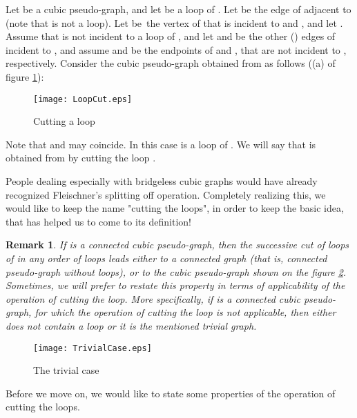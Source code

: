 \documentclass[fleqn,12pt,twoside]{article}
\newtheorem{remark}{Remark}
\begin{document}
Let  be a cubic pseudo-graph, and let  be a loop of . Let  be the edge of  adjacent to  (note that  is not a
loop). Let  be\ the vertex of  that is incident to 
and , and
let . Assume that  is not incident to a loop of , and let  and  be the other () edges of  incident to , and assume  and  be the endpoints
of  and , that are not incident to , respectively.
Consider the cubic pseudo-graph  obtained from  as
follows ((a)
of figure \ref{loopcut}):

\begin{figure}[h]
\begin{center}
\texttt{[image: LoopCut.eps]}\\
\caption{Cutting a loop }\label{loopcut}
\end{center}
\end{figure}


Note that  and  may coincide. In this case  is a loop of . We will say that  is obtained from  by
cutting the loop .

People dealing especially with bridgeless cubic graphs would have
already recognized Fleischner's splitting off operation. Completely
realizing this, we would like to keep the name "cutting the loops",
in order to keep the basic idea, that has helped us to come to its
definition!

\begin{remark}
\label{SuccessiveCut}If  is a connected cubic pseudo-graph,
then the successive cut of loops of  in any order of loops
leads either to a connected graph (that is, connected pseudo-graph
without loops), or to the cubic pseudo-graph shown on the figure
\ref{TrivialCase}. Sometimes, we will prefer to restate this
property in terms of applicability of the operation of cutting the
loop. More specifically, if  is a connected cubic
pseudo-graph, for which the operation of cutting the loop is not
applicable, then either  does not contain a loop or it is the
mentioned trivial graph.
\end{remark}

\begin{figure}[h]
\begin{center}
\texttt{[image: TrivialCase.eps]}\\
\caption{The trivial case}\label{TrivialCase}
\end{center}
\end{figure}

Before we move on, we would like to state some properties of the
operation of cutting the loops.
\end{document}
